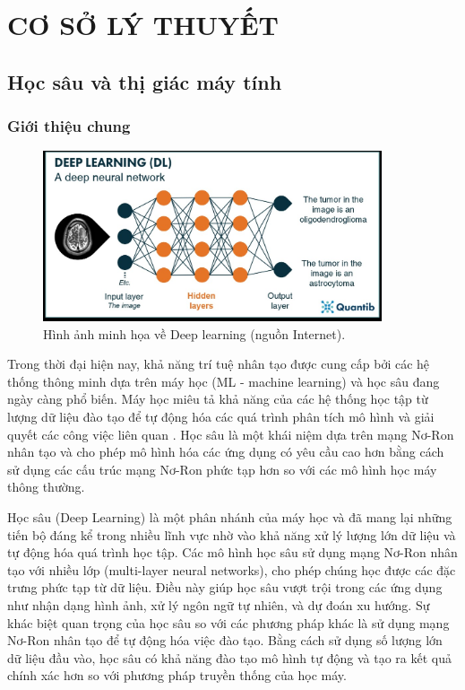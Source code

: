 \chapter{CƠ SỞ LÝ THUYẾT}
\section{Học sâu và thị giác máy tính}
\subsection{Giới thiệu chung}

\begin{figure}[!h]
	\centering
	\includegraphics[width=100mm]{fig/DeepLearning.jpg}
        \captionsetup{justification=centering}
	\caption{Hình ảnh minh họa về Deep learning (nguồn Internet).}
	\label{fig_DL}
\end{figure}

Trong thời đại hiện nay, khả năng trí tuệ nhân tạo được cung cấp bởi các hệ thống thông minh dựa trên máy học (ML - machine learning) và học sâu đang ngày càng phổ biến. Máy học miêu tả khả năng của các hệ thống học tập từ lượng dữ liệu đào tạo để tự động hóa các quá trình phân tích mô hình và giải quyết các công việc liên quan \cite{janiesch2021machine}. Học sâu là một khái niệm dựa trên mạng Nơ-Ron nhân tạo và cho phép mô hình hóa các ứng dụng có yêu cầu cao hơn bằng cách sử dụng các cấu trúc mạng Nơ-Ron phức tạp hơn so với các mô hình học máy thông thường.

Học sâu (Deep Learning) là một phân nhánh của máy học và đã mang lại những tiến bộ đáng kể trong nhiều lĩnh vực nhờ vào khả năng xử lý lượng lớn dữ liệu và tự động hóa quá trình học tập. Các mô hình học sâu sử dụng mạng Nơ-Ron nhân tạo với nhiều lớp (multi-layer neural networks), cho phép chúng học được các đặc trưng phức tạp từ dữ liệu. Điều này giúp học sâu vượt trội trong các ứng dụng như nhận dạng hình ảnh, xử lý ngôn ngữ tự nhiên, và dự đoán xu hướng. Sự khác biệt quan trọng của học sâu so với các phương pháp khác là sử dụng mạng Nơ-Ron nhân tạo để tự động hóa việc đào tạo. Bằng cách sử dụng số lượng lớn dữ liệu đầu vào, học sâu có khả năng đào tạo mô hình tự động và tạo ra kết quả chính xác hơn so với phương pháp truyền thống của học máy.

